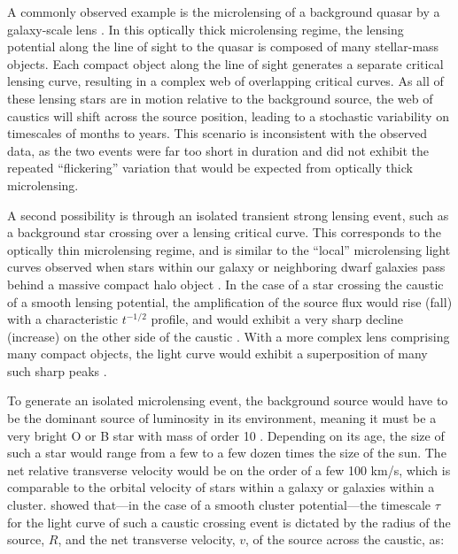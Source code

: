 A commonly observed example is the microlensing of a background quasar
by a galaxy-scale lens \citep{Wambsganss:2001, Kochanek:2004}.  In
this optically thick microlensing regime, the lensing potential along
the line of sight to the quasar is composed of many stellar-mass
objects.  Each compact object along the line of sight generates a
separate critical lensing curve, resulting in a complex web of
overlapping critical curves. As all of these lensing stars are in
motion relative to the background source, the web of caustics will
shift across the source position, leading to a stochastic variability
on timescales of months to years.  This scenario is inconsistent with
the observed data, as the two \spock events were far too short in
duration and did not exhibit the repeated ``flickering'' variation
that would be expected from optically thick microlensing.

A second possibility is through an isolated transient strong lensing
event, such as a background star crossing over a lensing critical
curve.  This corresponds to the optically thin microlensing regime,
and is similar to the ``local'' microlensing light curves observed
when stars within our galaxy or neighboring dwarf galaxies pass behind
a massive compact halo object \citep{Paczynski:1986, Alcock:1993,
  Aubourg:1993, Udalski:1993}.  In the case of a star crossing the
caustic of a smooth lensing potential, the amplification of the source
flux would rise (fall) with a characteristic $t^{-1/2}$ profile, and
would exhibit a very sharp decline (increase) on the other side of the
caustic \citep{Schneider:1986,MiraldaEscude:1991}.  With a more
complex lens comprising many compact objects, the light curve would
exhibit a superposition of many such sharp peaks \citep{Lewis:1993}.

To generate an isolated microlensing event, the background source
would have to be the dominant source of luminosity in its environment,
meaning it must be a very bright O or B star with mass of order 10
\Msun.  Depending on its age, the size of such a star would range from
a few to a few dozen times the size of the sun.  The net relative
transverse velocity would be on the order of a few 100 km/s, which is
comparable to the orbital velocity of stars within a galaxy or
galaxies within a cluster.  \citet{MiraldaEscude:1991} showed
that---in the case of a smooth cluster potential---the timescale
$\tau$ for the light curve of such a caustic crossing event is
dictated by the radius of the source, $R$, and the net transverse
velocity, $v$, of the source across the caustic, as:

